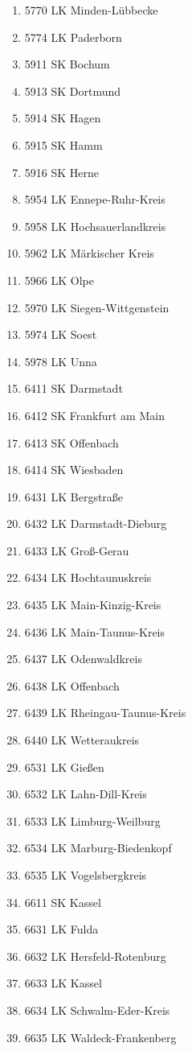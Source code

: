 \begin{enumerate}[itemsep=-6mm]
\item 5770 LK Minden-Lübbecke
\item 5774 LK Paderborn
\item 5911 SK Bochum
\item 5913 SK Dortmund
\item 5914 SK Hagen
\item 5915 SK Hamm
\item 5916 SK Herne
\item 5954 LK Ennepe-Ruhr-Kreis
\item 5958 LK Hochsauerlandkreis
\item 5962 LK Märkischer Kreis
\item 5966 LK Olpe
\item 5970 LK Siegen-Wittgenstein
\item 5974 LK Soest
\item 5978 LK Unna
\item 6411 SK Darmstadt
\item 6412 SK Frankfurt am Main
\item 6413 SK Offenbach
\item 6414 SK Wiesbaden
\item 6431 LK Bergstraße
\item 6432 LK Darmstadt-Dieburg
\item 6433 LK Groß-Gerau
\item 6434 LK Hochtaunuskreis
\item 6435 LK Main-Kinzig-Kreis
\item 6436 LK Main-Taunus-Kreis
\item 6437 LK Odenwaldkreis
\item 6438 LK Offenbach
\item 6439 LK Rheingau-Taunus-Kreis
\item 6440 LK Wetteraukreis
\item 6531 LK Gießen
\item 6532 LK Lahn-Dill-Kreis
\item 6533 LK Limburg-Weilburg
\item 6534 LK Marburg-Biedenkopf
\item 6535 LK Vogelsbergkreis
\item 6611 SK Kassel
\item 6631 LK Fulda
\item 6632 LK Hersfeld-Rotenburg
\item 6633 LK Kassel
\item 6634 LK Schwalm-Eder-Kreis
\item 6635 LK Waldeck-Frankenberg

\end{enumerate}
